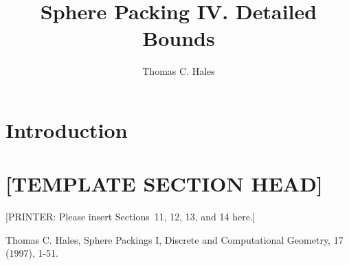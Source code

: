 \documentclass[11pt]{amsart}
\title{Sphere Packing IV. Detailed Bounds}
\author{Thomas C. Hales}
\begin{document}
\begin{abstract}

\end{abstract}

\maketitle

\section*{Introduction}



\section*{[TEMPLATE SECTION HEAD]}

[PRINTER: Please insert Sections~11, 12, 13, and 14 here.]






\begin{thebibliography}{Hal97a}

 Thomas C. Hales, Sphere Packings I,
    Discrete and Computational Geometry, 17 (1997), 1-51.

\end{thebibliography}
\end{document}
